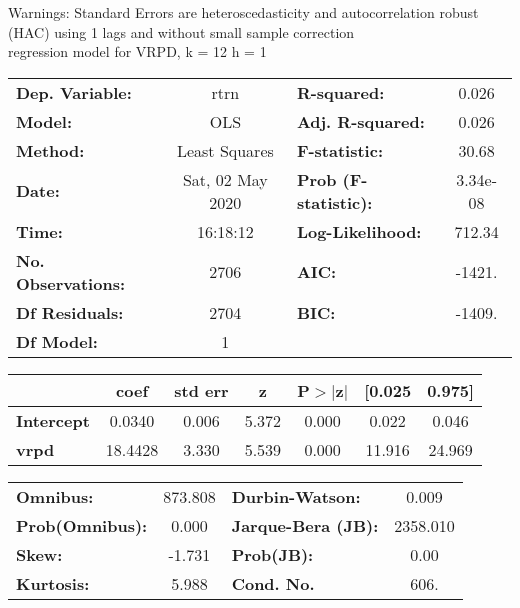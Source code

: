 Warnings: \newline
 [1] Standard Errors are heteroscedasticity and autocorrelation robust (HAC) using 1 lags and without small sample correction\\ 

regression model for VRPD, k = 12 h = 1\begin{center}
\begin{tabular}{lclc}
\toprule
\textbf{Dep. Variable:}    &       rtrn       & \textbf{  R-squared:         } &     0.026   \\
\textbf{Model:}            &       OLS        & \textbf{  Adj. R-squared:    } &     0.026   \\
\textbf{Method:}           &  Least Squares   & \textbf{  F-statistic:       } &     30.68   \\
\textbf{Date:}             & Sat, 02 May 2020 & \textbf{  Prob (F-statistic):} &  3.34e-08   \\
\textbf{Time:}             &     16:18:12     & \textbf{  Log-Likelihood:    } &    712.34   \\
\textbf{No. Observations:} &        2706      & \textbf{  AIC:               } &    -1421.   \\
\textbf{Df Residuals:}     &        2704      & \textbf{  BIC:               } &    -1409.   \\
\textbf{Df Model:}         &           1      & \textbf{                     } &             \\
\bottomrule
\end{tabular}
\begin{tabular}{lcccccc}
                   & \textbf{coef} & \textbf{std err} & \textbf{z} & \textbf{P$> |$z$|$} & \textbf{[0.025} & \textbf{0.975]}  \\
\midrule
\textbf{Intercept} &       0.0340  &        0.006     &     5.372  &         0.000        &        0.022    &        0.046     \\
\textbf{vrpd}      &      18.4428  &        3.330     &     5.539  &         0.000        &       11.916    &       24.969     \\
\bottomrule
\end{tabular}
\begin{tabular}{lclc}
\textbf{Omnibus:}       & 873.808 & \textbf{  Durbin-Watson:     } &    0.009  \\
\textbf{Prob(Omnibus):} &   0.000 & \textbf{  Jarque-Bera (JB):  } & 2358.010  \\
\textbf{Skew:}          &  -1.731 & \textbf{  Prob(JB):          } &     0.00  \\
\textbf{Kurtosis:}      &   5.988 & \textbf{  Cond. No.          } &     606.  \\
\bottomrule
\end{tabular}
\end{center}

